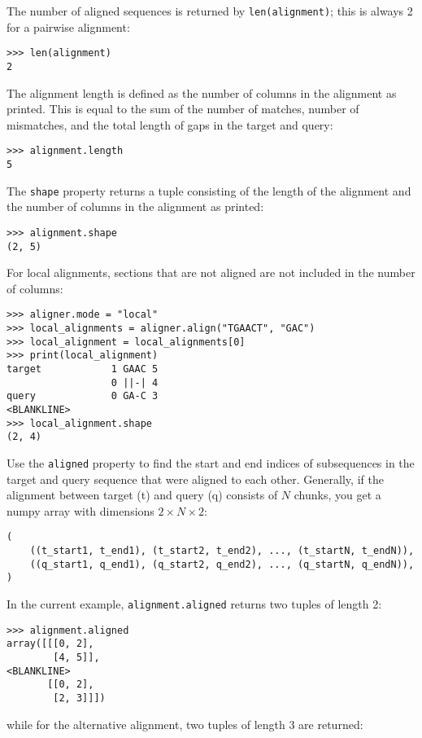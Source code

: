 The number of aligned sequences is returned by \verb+len(alignment)+; this is
always 2 for a pairwise alignment:

\begin{verbatim}
>>> len(alignment)
2
\end{verbatim}

The alignment length is defined as the number of columns in the alignment as
printed. This is equal to the sum of the number of matches, number of
mismatches, and the total length of gaps in the target and query:

\begin{verbatim}
>>> alignment.length
5
\end{verbatim}

The \verb+shape+ property returns a tuple consisting of the length of the
alignment and the number of columns in the alignment as printed:

\begin{verbatim}
>>> alignment.shape
(2, 5)
\end{verbatim}

For local alignments, sections that are not aligned are not included in the number of columns:
\begin{verbatim}
>>> aligner.mode = "local"
>>> local_alignments = aligner.align("TGAACT", "GAC")
>>> local_alignment = local_alignments[0]
>>> print(local_alignment)
target            1 GAAC 5
                  0 ||-| 4
query             0 GA-C 3
<BLANKLINE>
>>> local_alignment.shape
(2, 4)
\end{verbatim}

Use the \verb+aligned+ property to find the start and end indices of subsequences in the target and query sequence that were aligned to each other.
Generally, if the alignment between target (t) and query (q) consists of $N$
chunks, you get a numpy array with dimensions $2 \times N \times 2$:

\begin{verbatim}
(
    ((t_start1, t_end1), (t_start2, t_end2), ..., (t_startN, t_endN)),
    ((q_start1, q_end1), (q_start2, q_end2), ..., (q_startN, q_endN)),
)
\end{verbatim}

In the current example, \verb+alignment.aligned+ returns two tuples of length 2:

\begin{verbatim}
>>> alignment.aligned
array([[[0, 2],
        [4, 5]],
<BLANKLINE>
       [[0, 2],
        [2, 3]]])
\end{verbatim}
while for the alternative alignment, two tuples of length 3 are returned:

